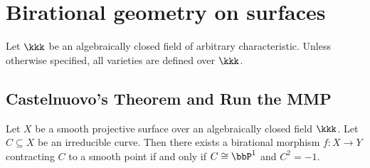 \section{Birational geometry on surfaces}

Let \(\kkk\) be an algebraically closed field of arbitrary characteristic.
Unless otherwise specified, all varieties are defined over \(\kkk\).

\subsection{Castelnuovo's Theorem and Run the MMP}

    \begin{theorem}\label{thm:castelnuovo_contractibility_criterion}
        Let \(X\) be a smooth projective surface over an algebraically closed field \(\kkk\).
        Let \(C\subseteq X\) be an irreducible curve.
        Then there exists a birational morphism \(f:X\to Y\) contracting \(C\) to a smooth point if and only if \(C\cong \bbP^1\) and \(C^2=-1\).
    \end{theorem}

